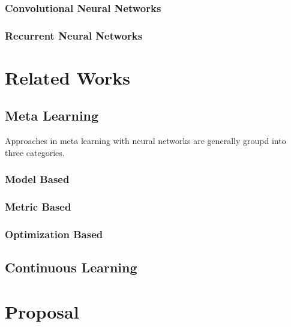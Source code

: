 \documentclass{report}
\begin{document}
	\subsection{Convolutional Neural Networks}
	\subsection{Recurrent Neural Networks}
	
	\chapter{Related Works}
	\section{Meta Learning}
	Approaches in meta learning with neural networks are generally groupd into three categories.
	\subsection{Model Based}
	\subsection{Metric Based}
	\subsection{Optimization Based}
	\section{Continuous Learning}
	
	\chapter{Proposal}
	
\end{document}
